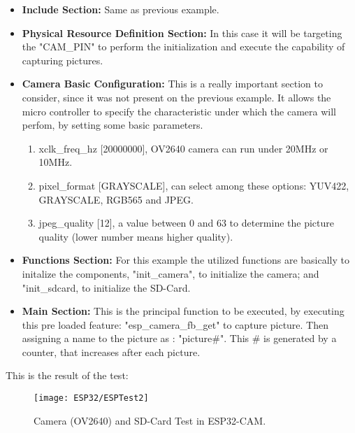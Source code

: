 \begin{itemize}
    \item\textbf{Include Section: }Same as previous example.
    \item\textbf{Physical Resource Definition Section: }In this case it will be targeting the "CAM\_PIN" to perform the initialization and execute the capability of capturing pictures.
    \item\textbf{Camera Basic Configuration: } This is a really important section to consider, since it was not present on the previous example. It allows the micro controller to specify the characteristic under which the camera will perfom, by setting some basic parameters.
    
    \begin{enumerate}
        \item xclk\_freq\_hz [20000000], OV2640 camera can run under 20MHz or 10MHz.
        \item pixel\_format [GRAYSCALE], can select among these options: YUV422, GRAYSCALE, RGB565 and JPEG.
        \item jpeg\_quality [12], a value between 0 and 63 to determine the picture quality (lower number means higher quality).
    \end{enumerate}

    \item\textbf{Functions Section: }For this example the utilized functions are basically to initalize the components, "init\_camera", to initialize the camera; and "init\_sdcard, to initialize the SD-Card.
    \item\textbf{Main Section: }This is the principal function to be executed, by executing this pre loaded feature: "esp\_camera\_fb\_get" to capture picture. Then assigning a name to the picture as : "picture\#". This \# is generated by a counter, that increases after each picture. 
\end{itemize}

This is the result of the test: 

\begin{figure}  
    \begin{center}
        \texttt{[image: ESP32/ESPTest2]}
        \caption{Camera (OV2640) and SD-Card Test in ESP32-CAM.} 
        \label{fig:Camera (OV2640) and SD-Card Test in ESP32-CAM.}
    \end{center}
\end{figure}	



